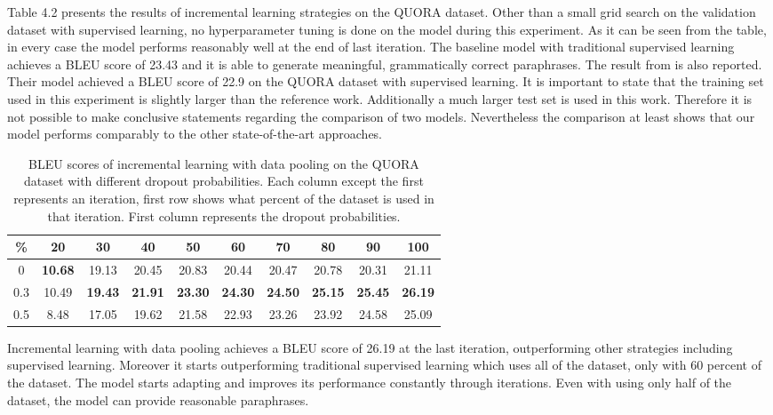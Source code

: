 Table 4.2 presents the results of incremental learning strategies on the QUORA dataset. Other than a small grid search on the validation dataset with supervised learning, no hyperparameter tuning is done on the model during this experiment. As it can be seen from the table, in every case the model performs reasonably well at the end of last iteration. The baseline model with traditional supervised learning achieves a BLEU score of 23.43 and it is able to generate meaningful, grammatically correct paraphrases. The result from \cite{Guptaetal} is also reported. Their model achieved a BLEU score of 22.9 on the QUORA dataset with supervised learning. It is important to state that the training set used in this experiment is slightly larger than the reference work. Additionally a much larger test set is used in this work. Therefore it is not possible to make conclusive statements regarding the comparison of two models. Nevertheless the comparison at least shows that our model performs comparably to the other state-of-the-art approaches.

\begin{table}[t]
\centering
\small
 \begin{tabular}{|c | c | c | c | c | c | c | c | c | c |} 
 \hline
 \% & 20 & 30 & 40 & 50 & 60 & 70 & 80 & 90 & 100 \\ [0.5ex] 
 \hline
  0 & \textbf{10.68} & 19.13 & 20.45 & 20.83 & 20.44 & 20.47 & 20.78 & 20.31 & 21.11  \\ 
 \hline
  0.3 & 10.49 & \textbf{19.43} & \textbf{21.91} & \textbf{23.30} & \textbf{24.30} & \textbf{24.50} & \textbf{25.15} & \textbf{25.45} & \textbf{26.19} \\ 
 \hline
  0.5 & 8.48 & 17.05 & 19.62 & 21.58 & 22.93 & 23.26 & 23.92 & 24.58 & 25.09 \\ 
 \hline
\end{tabular}
\caption{BLEU scores of incremental learning with data pooling on the QUORA dataset with different dropout probabilities. Each column except the first represents an iteration, first row shows what percent of the dataset is used in that iteration. First column represents the dropout probabilities.}
\end{table}

Incremental learning with data pooling achieves a BLEU score of 26.19 at the last iteration, outperforming other strategies including supervised learning. Moreover it starts outperforming traditional supervised learning which uses all of the dataset, only with 60 percent of the dataset. The model starts adapting and improves its performance constantly through iterations. Even with using only half of the dataset, the model can provide reasonable paraphrases. 

